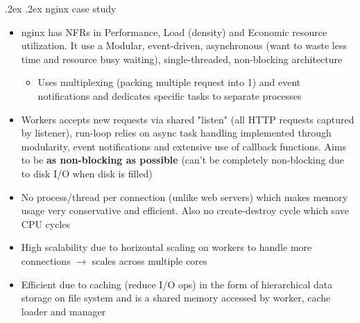 \documentclass[10pt,landscape,a4paper]{article}
\makeatletter
\renewcommand{\subsection}{\@startsection{subsection}{1}{0mm}%
	{.2ex}%
	{.2ex}%
	{\sffamily\bfseries}}
\makeatother
\begin{document}
\begin{multicols*}{4}
		\subsection{nginx case study}
		\begin{itemize}
			\item nginx has NFRs in Performance, Load (density) and Economic resource utilization. It use a Modular, event-driven, asynchronous (want to waste less time and resource busy waiting), single-threaded,
			non-blocking architecture
			\begin{itemize}
				\item Uses multiplexing (packing multiple request into 1) and event notifications and dedicates specific tasks to separate processes
			\end{itemize}
		\item Workers accepts new requests via shared "listen" (all HTTP requests captured by listener), run-loop relies on async task handling implemented through modularity, event notifications and extensive use of callback functions. Aims to be \textbf{as non-blocking as possible} (can't be completely non-blocking due to disk I/O when disk is filled)
		\item No process/thread per connection (unlike web servers) which makes memory usage very conservative and efficient. Also no create-destroy cycle which save CPU cycles
		\item High scalability due to horizontal scaling on workers to handle more connections $\rightarrow$ scales across multiple cores
		\item Efficient due to caching (reduce I/O ops) in the form of hierarchical data storage on file system and is a shared memory accessed by worker, cache loader and manager
		\end{itemize}

\end{multicols*}
\end{document}
